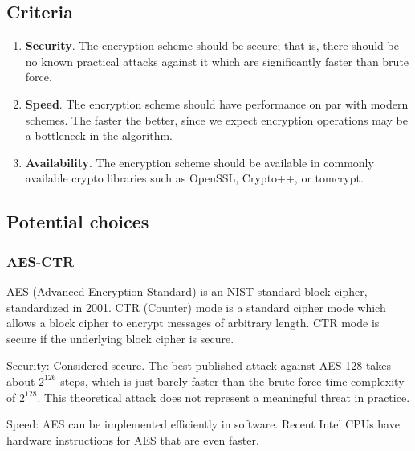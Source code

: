 
\subsection{ Criteria }

\begin{enumerate}
  \item \textbf{Security}.
  The encryption scheme should be secure; that is, there should be no known practical attacks against it which are significantly faster than brute force.

  \item \textbf{Speed}.
  The encryption scheme should have performance on par with modern schemes. The faster the better, since we expect encryption operations may be a bottleneck in the algorithm.

  \item \textbf{Availability}.
  The encryption scheme should be available in commonly available crypto libraries such as OpenSSL, Crypto++, or tomcrypt.

\end{enumerate}

\subsection{ Potential choices }
\subsubsection{ AES-CTR }

AES (Advanced Encryption Standard) is an NIST standard block cipher, standardized in 2001. CTR (Counter) mode is a standard cipher mode which allows a block cipher to encrypt messages of arbitrary length. CTR mode is secure if the underlying block cipher is secure.


Security: Considered secure. The best published attack against AES-128 takes about $2^{126}$ steps, which is just barely faster than the brute force time complexity of $2^{128}$. %
This theoretical attack does not represent a meaningful threat in practice.

Speed: AES can be implemented efficiently in software. %
Recent Intel CPUs have hardware instructions for AES that are even faster.

